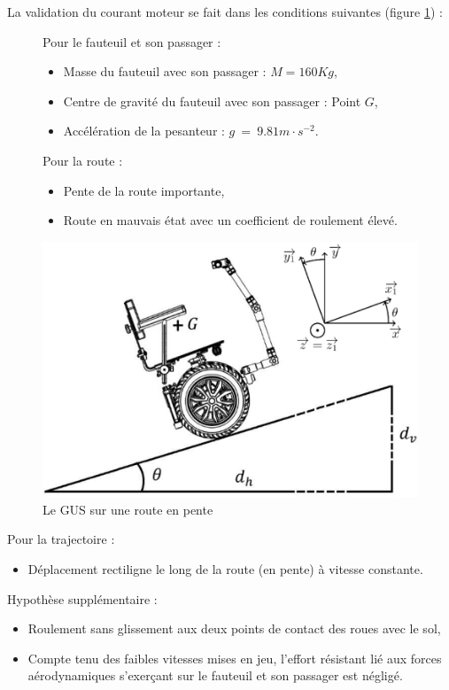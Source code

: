 La validation du courant moteur se fait dans les conditions suivantes (figure \ref{fig07}) :

\begin{figure}[ht!]
\begin{minipage}{0.5\linewidth}
Pour le fauteuil et son passager :
\begin{itemize}
 \item Masse du fauteuil avec son passager : $M=160Kg$,
 \item Centre de gravité du fauteuil avec son passager : Point $G$,
 \item Accélération de la pesanteur : $g~=~9.81m\cdot s^{-2}$. 
\end{itemize}

Pour la route :
\begin{itemize}
 \item Pente de la route importante,
 \item Route en mauvais état avec un coefficient de roulement élevé.
\end{itemize}
\end{minipage}\hfill
\begin{minipage}{0.45\linewidth}
\centering\includegraphics[width=0.9\linewidth]{img/fig07}
\caption{\label{fig07}Le GUS sur une route en pente}
\end{minipage}
\end{figure}

Pour la trajectoire :
\begin{itemize}
 \item Déplacement rectiligne le long de la route (en pente) à vitesse constante.
\end{itemize}

\newpage

Hypothèse supplémentaire :
\begin{itemize}
 \item Roulement sans glissement aux deux points de contact des roues avec le sol,
 \item Compte tenu des faibles vitesses mises en jeu, l'effort résistant lié aux forces aérodynamiques s'exerçant sur le fauteuil et son passager est négligé.
\end{itemize}

